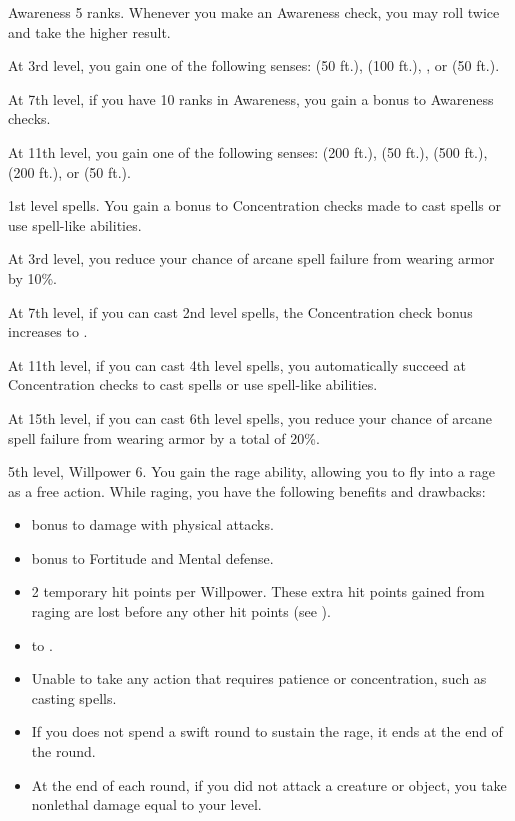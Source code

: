     \featpre Awareness 5 ranks.
    \featben Whenever you make an Awareness check, you may roll twice and take the higher result.

    At 3rd level, you gain one of the following senses:  (50 ft.),  (100 ft.), , or  (50 ft.).

    At 7th level, if you have 10 ranks in Awareness, you gain a  bonus to Awareness checks.

    At 11th level, you gain one of the following senses:  (200 ft.),  (50 ft.),  (500 ft.),  (200 ft.), or  (50 ft.).

    \featpre 1st level spells.
    \featben You gain a  bonus to Concentration checks made to cast spells or use spell-like abilities.

    At 3rd level, you reduce your chance of arcane spell failure from wearing armor by 10\%.

    At 7th level, if you can cast 2nd level spells, the Concentration check bonus increases to .

    At 11th level, if you can cast 4th level spells, you automatically succeed at Concentration checks to cast spells or use spell-like abilities.

    At 15th level, if you can cast 6th level spells, you reduce your chance of arcane spell failure from wearing armor by a total of 20\%.

    \featpres 5th level, Willpower 6.
    \featben You gain the rage ability, allowing you to fly into a rage as a free action.
    While raging, you have the following benefits and drawbacks:
    \begin{itemize}
        \item {} bonus to damage with physical attacks.
        \item {} bonus to Fortitude and Mental defense.
        \item 2 temporary hit points per Willpower.
            These extra hit points gained from raging are lost before any other hit points (see ).
        \item {} to .
        \item Unable to take any action that requires patience or concentration, such as casting spells.
        \item If you does not spend a swift round to sustain the rage, it ends at the end of the round.
        \item At the end of each round, if you did not attack a creature or object, you take nonlethal damage equal to your level.
    \end{itemize}


